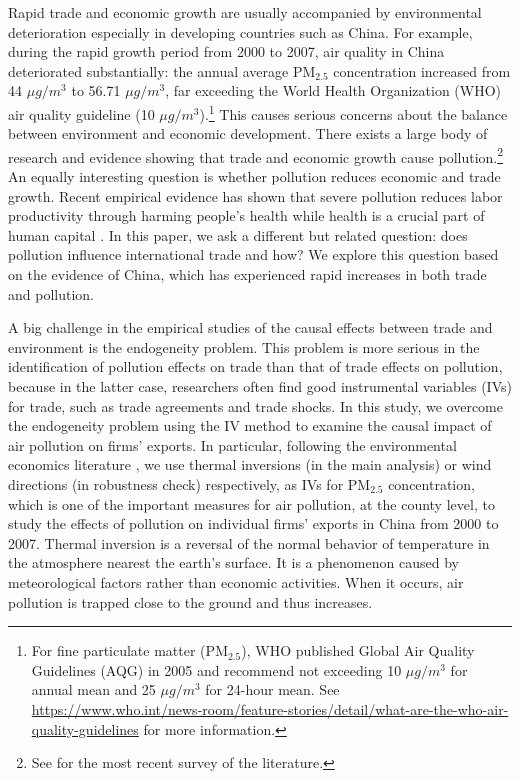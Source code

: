 \documentclass[12pt]{article}
\begin{document}
\label{sec:1} Rapid trade and economic growth are usually accompanied by
environmental deterioration especially in developing countries such as
China. For example, during the rapid growth period from 2000 to 2007, air quality in China deteriorated substantially:
 the annual average $\mathrm{PM_{2.5}}$
concentration increased from 44 $\mu g/m^{3}$ to 56.71 $\mu g/m^{3}$, far exceeding the World Health Organization
(WHO) air quality
guideline (10 $\mu g/m^{3}$).\footnote{%
For fine particulate matter ($\mathrm{PM_{2.5}}$), WHO published Global Air Quality Guidelines (AQG) in 2005 and recommend not exceeding 10 $\mu g/m^{3}$ for annual mean and 25 $\mu g/m^{3}$ for 24-hour mean.
See %
\url{https://www.who.int/news-room/feature-stories/detail/what-are-the-who-air-quality-guidelines}
for more information.} This causes serious
concerns about the balance between environment and economic development. There exists
a large body of research and evidence showing that trade and economic growth cause
pollution.\footnote{%
See \cite{cherniwchan2017trade} for the most recent survey of the literature.%
} An equally interesting question is whether pollution reduces economic and
trade growth. Recent empirical evidence has shown that severe pollution
reduces labor productivity through harming people's health while health is a crucial part of human capital %
\citep{graff2012impact,chang2016particulate,zhang2018impact,fu2021air,somanathan2021impact,adhvaryu2022management}%
. In this paper, we ask a different but related question: does pollution
influence international trade and how? We explore this question based on the
evidence of China, which has experienced rapid increases in both trade and
pollution.

A big challenge in the empirical studies of the causal effects between trade
and environment is the endogeneity problem. This problem is more serious in
the identification of pollution effects on trade than that of trade effects on
pollution, because in the latter case, researchers often find good
instrumental variables (IVs) for trade, such as trade agreements and trade shocks.
In this study, we overcome the endogeneity problem using the IV method to examine the causal impact of air pollution on firms'
exports. In particular, following the environmental economics literature 
\citep[e.g.,][]{fu2021air,
fu2021trans,NBERw28401,chen2022effect}, we use thermal inversions (in
the main analysis) or wind directions (in robustness check) respectively,
as IVs for $\mathrm{PM_{2.5}}$ concentration, which is one of the important measures
for air pollution, at the county level, to study the effects of
pollution on individual firms' exports in China from 2000 to 2007. Thermal
inversion is a reversal of the normal behavior of temperature in the
atmosphere nearest the earth's surface. It is a phenomenon caused by
meteorological factors rather than economic activities. When it occurs, air
pollution is trapped close to the ground and thus increases.
\end{document}
